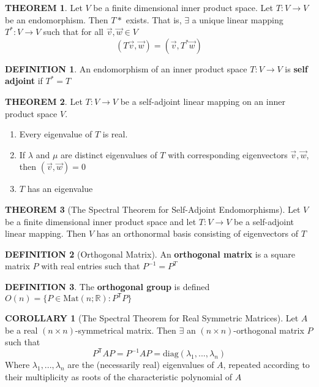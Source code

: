 \documentclass[12pt]{article}
\theoremstyle{definition}
\newtheorem{definition}{DEFINITION}[subsection]
\newtheorem{theorem}{THEOREM}[subsection]
\newcommand{\Mat}{\text{Mat}}
\newcommand{\transpose}[1]{#1^\mathsf{T}}
\newtheorem{corollary}{COROLLARY}[subsection]
\begin{document}
\begin{theorem}
    Let $V$ be a finite dimensional inner product space. Let $T:V \rightarrow V$ be an endomorphism. Then $T*$ exists. That is, $\exists$ a unique linear mapping $T^*: V \rightarrow V$ such that for all $\vec{v}, \vec{w} \in V$
    $$(T\vec{v}, \vec{w}) = (\vec{v}, T^*\vec{w})$$
\end{theorem}

\begin{definition}
    An endomorphism of an inner product space $T:V \rightarrow V$ is \textbf{self adjoint} if $T^* = T$
\end{definition}

\begin{theorem}
    Let $T:V \rightarrow V$ be a self-adjoint linear mapping on an inner product space $V$.
    \begin{enumerate}
        \item Every eigenvalue of $T$ is real.
        \item If $\lambda$ and $\mu$ are distinct eigenvalues of $T$ with corresponding eigenvectors $\vec{v}, \vec{w}$, then $(\vec{v}, \vec{w}) = 0$
        \item $T$ has an eigenvalue
    \end{enumerate}
\end{theorem}

\begin{theorem}[The Spectral Theorem for Self-Adjoint Endomorphisms]
    Let $V$ be a finite dimensional inner product space and let $T:V \rightarrow V$ be a self-adjoint linear mapping. Then $V$ has an orthonormal basis consisting of eigenvectors of $T$
\end{theorem}

\begin{definition}[Orthogonal Matrix]
    An \textbf{orthogonal matrix} is a square matrix $P$ with real entries such that $P^{-1} = P^T$ 
\end{definition}

\begin{definition}
    The \textbf{orthogonal group} is defined $O(n) = \{P \in \Mat(n;\mathbb{R}): \transpose{P}P\}$
\end{definition}

\begin{corollary}[The Spectral Theorem for Real Symmetric Matrices]
    Let $A$ be a real $(n \times n)$-symmetrical matrix. Then $\exists$ an $(n \times n)$-orthogonal matrix $P$ such that
    $$\transpose{P}AP = P^{-1}AP = \text{diag}(\lambda_1,..., \lambda_n)$$
    Where $\lambda_1, ..., \lambda_n$ are the (necessarily real) eigenvalues of $A$, repeated according to their multiplicity as roots of the characteristic polynomial of $A$
\end{corollary}
\end{document}
